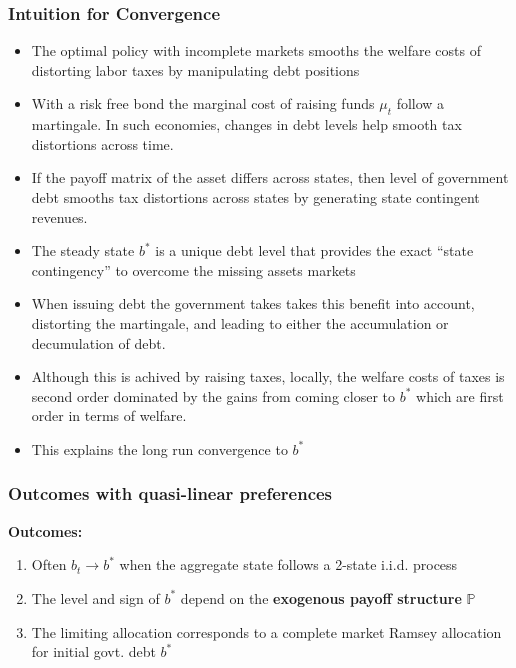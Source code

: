 \documentclass{beamer}
\begin{document}
\begin{frame}
	\frametitle{Intuition for Convergence}
	\small 
	\begin{itemize}
	\item The optimal policy with incomplete markets smooths the welfare costs of distorting labor taxes by manipulating debt positions
	\item With a risk free bond the marginal cost of raising funds $\mu_t$ follow a martingale. In such economies,  changes in debt levels help smooth tax distortions across time. 		
	\item  If the payoff matrix of the asset differs across states, then level of government debt smooths tax distortions across states by generating state contingent revenues.
	\item The steady state $b^*$ is a unique debt level that provides the exact ``state contingency'' to overcome the missing assets markets	
	\item  When issuing debt the government takes takes this benefit into account, distorting the martingale, and leading to either the accumulation or decumulation of debt.	
	\item Although this is achived by raising taxes, locally,  the welfare costs of taxes is second order dominated by the gains from coming closer to $b^*$ which are first order in terms of welfare.
	\item This explains the long run convergence to $b^*$
	\end{itemize}
\end{frame}

\begin{frame}
 \frametitle{Outcomes with quasi-linear preferences}
 \textbf{Outcomes:}
 \begin{enumerate}
  \item  Often $b_t\to b^*$ when the aggregate state follows a 2-state i.i.d. process
  \item The level  and sign of $b^*$ depend on the \textbf{exogenous payoff structure} $\mathbb{P}$
  \item The limiting allocation corresponds to a complete market Ramsey allocation for initial govt. debt $b^*$
 \end{enumerate}

 \end{frame}
\end{document}
